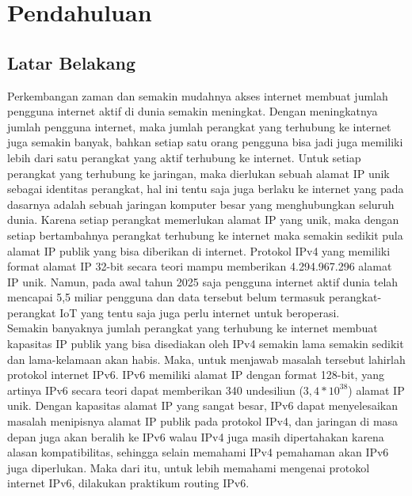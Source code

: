 \section{Pendahuluan}
\subsection{Latar Belakang}
\indent
Perkembangan zaman dan semakin mudahnya akses internet membuat jumlah pengguna internet aktif di dunia semakin meningkat. Dengan meningkatnya jumlah pengguna internet, maka jumlah perangkat yang terhubung ke internet juga semakin banyak, bahkan setiap satu orang pengguna bisa jadi juga memiliki lebih dari satu perangkat yang aktif terhubung ke internet. Untuk setiap perangkat yang terhubung ke jaringan, maka dierlukan sebuah alamat IP unik sebagai identitas perangkat, hal ini tentu saja juga berlaku ke internet yang pada dasarnya adalah sebuah jaringan komputer besar yang menghubungkan seluruh dunia. Karena setiap perangkat memerlukan alamat IP yang unik, maka dengan setiap bertambahnya perangkat terhubung ke internet maka semakin sedikit pula alamat IP publik yang bisa diberikan di internet. Protokol IPv4 yang memiliki format alamat IP 32-bit secara teori mampu memberikan 4.294.967.296 alamat IP unik. Namun, pada awal tahun 2025 saja pengguna internet aktif dunia telah mencapai 5,5 miliar pengguna dan data tersebut belum termasuk perangkat-perangkat IoT yang tentu saja juga perlu internet untuk beroperasi.
\\
\indent
Semakin banyaknya jumlah perangkat yang terhubung ke internet membuat kapasitas IP publik yang bisa disediakan oleh IPv4 semakin lama semakin sedikit dan lama-kelamaan akan habis. Maka, untuk menjawab masalah tersebut lahirlah protokol internet IPv6. IPv6 memiliki alamat IP dengan format 128-bit, yang artinya IPv6 secara teori dapat memberikan 340 undesiliun ($3,4*10^{38}$) alamat IP unik. Dengan kapasitas alamat IP yang sangat besar, IPv6 dapat menyelesaikan masalah menipisnya alamat IP publik pada protokol IPv4, dan jaringan di masa depan juga akan beralih ke IPv6 walau IPv4 juga masih dipertahakan karena alasan kompatibilitas, sehingga selain memahami IPv4 pemahaman akan IPv6 juga diperlukan. Maka dari itu, untuk lebih memahami mengenai protokol internet IPv6, dilakukan praktikum routing IPv6.

